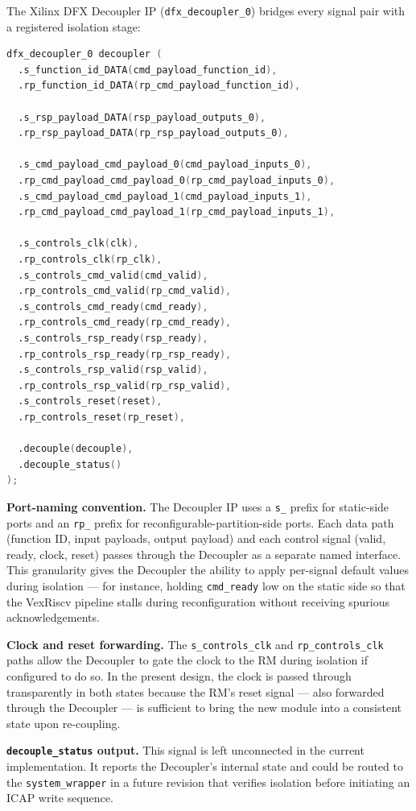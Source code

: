 The Xilinx DFX Decoupler IP (\texttt{dfx\_decoupler\_0}) bridges every signal pair with a registered isolation stage:

\begin{lstlisting}[style=mystyle, language=Verilog]
dfx_decoupler_0 decoupler (
  .s_function_id_DATA(cmd_payload_function_id),
  .rp_function_id_DATA(rp_cmd_payload_function_id),

  .s_rsp_payload_DATA(rsp_payload_outputs_0),
  .rp_rsp_payload_DATA(rp_rsp_payload_outputs_0),

  .s_cmd_payload_cmd_payload_0(cmd_payload_inputs_0),
  .rp_cmd_payload_cmd_payload_0(rp_cmd_payload_inputs_0),
  .s_cmd_payload_cmd_payload_1(cmd_payload_inputs_1),
  .rp_cmd_payload_cmd_payload_1(rp_cmd_payload_inputs_1),

  .s_controls_clk(clk),
  .rp_controls_clk(rp_clk),
  .s_controls_cmd_valid(cmd_valid),
  .rp_controls_cmd_valid(rp_cmd_valid),
  .s_controls_cmd_ready(cmd_ready),
  .rp_controls_cmd_ready(rp_cmd_ready),
  .s_controls_rsp_ready(rsp_ready),
  .rp_controls_rsp_ready(rp_rsp_ready),
  .s_controls_rsp_valid(rsp_valid),
  .rp_controls_rsp_valid(rp_rsp_valid),
  .s_controls_reset(reset),
  .rp_controls_reset(rp_reset),

  .decouple(decouple),
  .decouple_status()
);
\end{lstlisting}

\textbf{Port-naming convention.} The Decoupler IP uses a \texttt{s\_} prefix for static-side ports and an \texttt{rp\_} prefix for reconfigurable-partition-side ports. Each data path (function ID, input payloads, output payload) and each control signal (valid, ready, clock, reset) passes through the Decoupler as a separate named interface. This granularity gives the Decoupler the ability to apply per-signal default values during isolation — for instance, holding \texttt{cmd\_ready} low on the static side so that the VexRiscv pipeline stalls during reconfiguration without receiving spurious acknowledgements.

\textbf{Clock and reset forwarding.} The \texttt{s\_controls\_clk} and \texttt{rp\_controls\_clk} paths allow the Decoupler to gate the clock to the RM during isolation if configured to do so. In the present design, the clock is passed through transparently in both states because the RM's reset signal — also forwarded through the Decoupler — is sufficient to bring the new module into a consistent state upon re-coupling.

\textbf{\texttt{decouple\_status} output.} This signal is left unconnected in the current implementation. It reports the Decoupler's internal state and could be routed to the \texttt{system\_wrapper} in a future revision that verifies isolation before initiating an ICAP write sequence.

